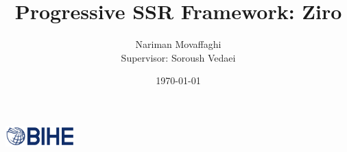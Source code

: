 \documentclass{article}
\author{Nariman Movaffaghi \\[0.4em]
Supervisor: Soroush Vedaei}
\title{Progressive SSR Framework: Ziro}
\date{\small \today}
\begin{document}
\maketitle

\begin{center}
	\vspace{0em}
    \includegraphics[width=0.2\textwidth]{bihe-logo.png} \\[1em]
\end{center}

\pagebreak



\tableofcontents
\pagebreak









\end{document}
